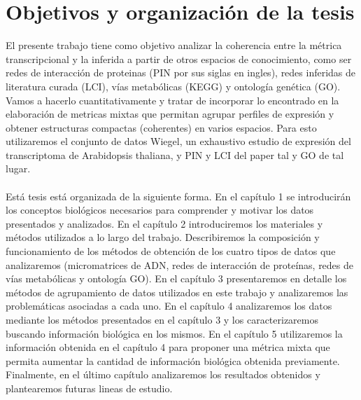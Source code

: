 \section*{Objetivos y organización de la tesis}
El presente trabajo tiene como objetivo analizar la coherencia entre la métrica transcripcional y la inferida a partir de otros espacios de conocimiento, como ser redes de interacción de proteinas (PIN por sus siglas en ingles), redes inferidas de literatura curada (LCI), vías metabólicas (KEGG) y ontología genética (GO).\\
Vamos a hacerlo cuantitativamente y tratar de incorporar lo encontrado en la elaboración de metricas mixtas que permitan agrupar perfiles de expresión y obtener estructuras compactas (coherentes) en varios espacios. Para esto utilizaremos el conjunto de datos Wiegel, un exhaustivo estudio de expresión del transcriptoma de Arabidopsis thaliana, y PIN y LCI del paper tal y GO de tal lugar.\\\\

Está tesis está organizada de la siguiente forma. En el capítulo 1 se introducirán los conceptos biológicos necesarios para comprender y motivar los datos presentados y analizados. En el capítulo 2 introduciremos los materiales y métodos utilizados a lo largo del trabajo. Describiremos la composición y funcionamiento de los métodos de obtención de los cuatro tipos de datos que analizaremos (micromatrices de ADN, redes de interacción de proteínas, redes de vías metabólicas y ontología GO). En el capítulo 3 presentaremos en detalle los métodos de agrupamiento de datos utilizados en este trabajo y analizaremos las problemáticas asociadas a cada uno. En el capítulo 4 analizaremos los datos mediante los métodos presentados en el capítulo 3 y los caracterizaremos buscando información biológica en los mismos. En el capítulo 5 utilizaremos la información obtenida en el capítulo 4 para proponer una métrica mixta que permita aumentar la cantidad de información biológica obtenida previamente. Finalmente, en el último capítulo analizaremos los resultados obtenidos y plantearemos futuras lineas de estudio.